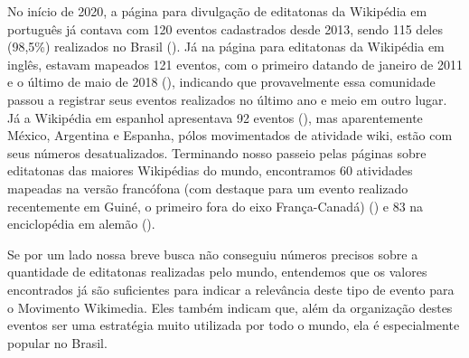 No início de 2020, a página para divulgação de editatonas da Wikipédia em português já contava com 120 eventos cadastrados desde 2013, sendo 115 deles (98,5\%) realizados no Brasil (). Já na página para editatonas da Wikipédia em inglês, estavam mapeados 121 eventos, com o primeiro datando de janeiro de 2011 e o último de maio de 2018 (), indicando que provavelmente essa comunidade passou a registrar seus eventos realizados no último ano e meio em outro lugar. Já a Wikipédia em espanhol apresentava 92 eventos (), mas aparentemente México, Argentina e Espanha, pólos movimentados de atividade wiki, estão com seus números desatualizados. Terminando nosso passeio pelas páginas sobre editatonas das maiores Wikipédias do mundo, encontramos 60 atividades mapeadas na versão francófona (com destaque para um evento realizado recentemente em Guiné, o primeiro fora do eixo França-Canadá) () e 83 na enciclopédia em alemão ().

Se por um lado nossa breve busca não conseguiu números precisos sobre a quantidade de editatonas realizadas pelo mundo, entendemos que os valores encontrados já são suficientes para indicar a relevância deste tipo de evento para o Movimento Wikimedia. Eles também indicam que, além da organização destes eventos ser uma estratégia muito utilizada por todo o mundo, ela é especialmente popular no Brasil.

